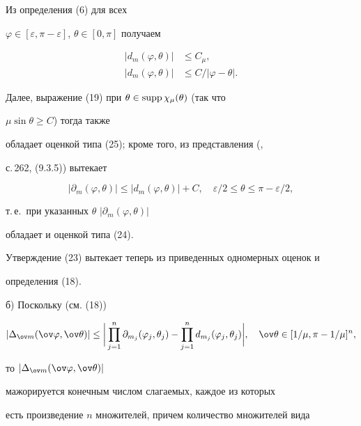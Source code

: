 \begin{pf} Из определения (6) для всех 


$\varphi\in[\varepsilon,\pi-\varepsilon]$, $\theta\in[0,\pi]$ получаем 


\begin{align} 


|d_m(\varphi,\theta)|&\le C_\mu,\\ 


|d_m(\varphi,\theta)|&\le C/|\varphi-\theta|. 


\end{align} 


Далее, выражение (19) при $\theta\in\operatorname{supp}\chi_\mu(\theta)$ (так что 


$\mu\sin\theta\ge C$) тогда также 


обладает оценкой типа (25); кроме того, из представления (\cite{3}, 


с.\,262, (9.3.5)) вытекает 


$$ 


|\partial_m(\varphi,\theta)|\le|d_m(\varphi,\theta)|+C,\quad 


\varepsilon/2\le\theta\le\pi-\varepsilon/2, 


$$ 


т.\,е.~при указанных $\theta$\; $|\partial_m(\varphi,\theta)|$ 


обладает и оценкой типа (24). 


Утверждение (23) вытекает теперь из приведенных одномерных оценок и 


определения (18). 


\end{pf} 


 


б) Поскольку (см. (18)) 


$$ 


|\Delta_{\ov m}(\ov\varphi,\ov\theta)|\le\bigg| 


\prod^n_{j=1}\partial_{m_j}(\varphi_j,\theta_j)- 


\prod^n_{j=1}d_{m_j}(\varphi_j,\theta_j)\bigg|,\quad 


\ov\theta\in[1/\mu,\pi-1/\mu]^n, 


$$ 


то $|\Delta_{\ov m}(\ov\varphi,\ov\theta)|$ 


мажорируется конечным числом слагаемых, каждое из которых 


есть произведение $n$ множителей, причем количество множителей вида 


